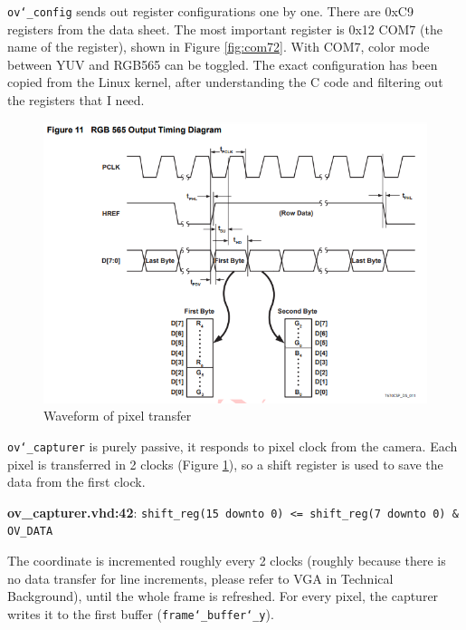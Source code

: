 \documentclass{article}
\begin{document}
	\texttt{ov\char`_config} sends out register configurations one by one. There are 0xC9 registers from the data sheet. The most important register is 0x12 COM7 (the name of the register), shown in Figure \ref{fig:com72}. With COM7, color mode between YUV and RGB565 can be toggled. The exact configuration has been copied from the Linux kernel, after understanding the C code \cite{reg6} and filtering out the registers that I need.
	\begin{figure}[h]
		\centering
		\includegraphics[scale=0.8]{rgb565}
		\caption{Waveform of pixel transfer}
		\label{fig:rgb565}
	\end{figure}
	\texttt{ov\char`_capturer} is purely passive, it responds to pixel clock from the camera. Each pixel is transferred in 2 clocks (Figure \ref{fig:rgb565}), so a shift register is used to save the data from the first clock.\begin{displayquote}
	\textbf{ov\_capturer.vhd:42}: \texttt{shift\_reg(15 downto 0) <= shift\_reg(7 downto 0) \& OV\_DATA}
	\end{displayquote}
	The coordinate is incremented roughly every 2 clocks (roughly because there is no data transfer for line increments, please refer to VGA in Technical Background), until the whole frame is refreshed. For every pixel, the capturer writes it to the first buffer (\texttt{frame\char`_buffer\char`_y}).
	\\
	
\end{document}
